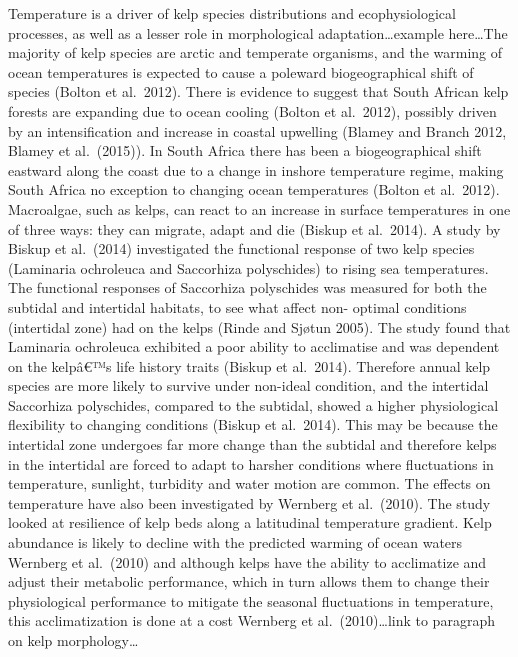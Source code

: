 \documentclass[
]{article}
\begin{document}
Temperature is a driver of kelp species distributions and
ecophysiological processes, as well as a lesser role in morphological
adaptation\ldots example here\ldots The majority of kelp species are
arctic and temperate organisms, and the warming of ocean temperatures is
expected to cause a poleward biogeographical shift of species (Bolton et
al.~2012). There is evidence to suggest that South African kelp forests
are expanding due to ocean cooling (Bolton et al.~2012), possibly driven
by an intensification and increase in coastal upwelling (Blamey and
Branch 2012, Blamey et al.~(2015)). In South Africa there has been a
biogeographical shift eastward along the coast due to a change in
inshore temperature regime, making South Africa no exception to changing
ocean temperatures (Bolton et al.~2012). Macroalgae, such as kelps, can
react to an increase in surface temperatures in one of three ways: they
can migrate, adapt and die (Biskup et al.~2014). A study by Biskup et
al.~(2014) investigated the functional response of two kelp species
(Laminaria ochroleuca and Saccorhiza polyschides) to rising sea
temperatures. The functional responses of Saccorhiza polyschides was
measured for both the subtidal and intertidal habitats, to see what
affect non- optimal conditions (intertidal zone) had on the kelps (Rinde
and Sjøtun 2005). The study found that Laminaria ochroleuca exhibited a
poor ability to acclimatise and was dependent on the kelpâ€™s life
history traits (Biskup et al.~2014). Therefore annual kelp species are
more likely to survive under non-ideal condition, and the intertidal
Saccorhiza polyschides, compared to the subtidal, showed a higher
physiological flexibility to changing conditions (Biskup et al.~2014).
This may be because the intertidal zone undergoes far more change than
the subtidal and therefore kelps in the intertidal are forced to adapt
to harsher conditions where fluctuations in temperature, sunlight,
turbidity and water motion are common. The effects on temperature have
also been investigated by Wernberg et al.~(2010). The study looked at
resilience of kelp beds along a latitudinal temperature gradient. Kelp
abundance is likely to decline with the predicted warming of ocean
waters Wernberg et al.~(2010) and although kelps have the ability to
acclimatize and adjust their metabolic performance, which in turn allows
them to change their physiological performance to mitigate the seasonal
fluctuations in temperature, this acclimatization is done at a cost
Wernberg et al.~(2010)\ldots link to paragraph on kelp
morphology\ldots{}
\end{document}
